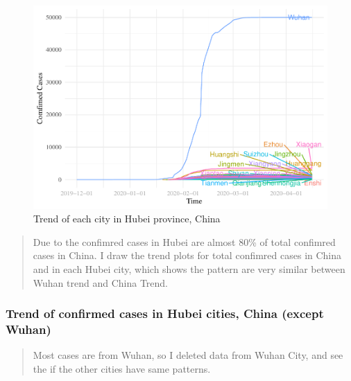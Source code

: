 \documentclass[12pt,]{article}
\newenvironment{Shaded}{\begin{snugshade}}{\end{snugshade}}
\newcommand{\CommentTok}[1]{\textcolor[rgb]{0.56,0.35,0.01}{\textit{#1}}}
\newcommand{\DataTypeTok}[1]{\textcolor[rgb]{0.13,0.29,0.53}{#1}}
\newcommand{\KeywordTok}[1]{\textcolor[rgb]{0.13,0.29,0.53}{\textbf{#1}}}
\newcommand{\NormalTok}[1]{#1}
\newcommand{\OperatorTok}[1]{\textcolor[rgb]{0.81,0.36,0.00}{\textbf{#1}}}
\newcommand{\OtherTok}[1]{\textcolor[rgb]{0.56,0.35,0.01}{#1}}
\newcommand{\StringTok}[1]{\textcolor[rgb]{0.31,0.60,0.02}{#1}}
\begin{document}
\begin{figure}
\centering
\includegraphics{Feng_ENV872_Project_files/figure-latex/HubeiCity_Trend.plot-1.pdf}
\caption{Trend of each city in Hubei province, China}
\end{figure}

\begin{quote}
Due to the confimred cases in Hubei are almost 80\% of total confimred
cases in China. I draw the trend plots for total confimred cases in
China and in each Hubei city, which shows the pattern are very similar
between Wuhan trend and China Trend.
\end{quote}

\hypertarget{trend-of-confirmed-cases-in-hubei-cities-china-except-wuhan}{%
\subsubsection{Trend of confirmed cases in Hubei cities, China (except
Wuhan)}\label{trend-of-confirmed-cases-in-hubei-cities-china-except-wuhan}}

\begin{quote}
Most cases are from Wuhan, so I deleted data from Wuhan City, and see
the if the other cities have same patterns.
\end{quote}

\begin{Shaded}
\end{Shaded}
\end{document}
